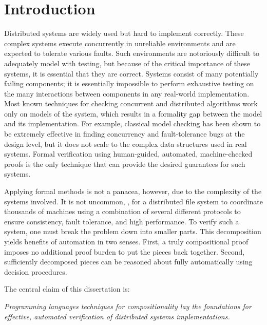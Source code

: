 \chapter{Introduction}

Distributed systems are widely used but hard to implement correctly.
These complex systems execute concurrently in unreliable environments
and are expected to tolerate various faults.
  Such environments are
notoriously difficult to adequately model with testing, but because
of the critical importance of these systems, it is essential that
they are correct.
Systems consist of many potentially failing components; it is
essentially impossible to perform exhaustive testing on the many
interactions between components in any real-world
implementation.
Most known techniques for checking concurrent and
distributed algorithms work only on models of the system, which
results in a formality gap between the model and its
implementation. For example, classical model checking has been shown
to be extremely effective in finding concurrency and fault-tolerance
bugs at the design level, but it does not scale to the complex data
structures used in real systems.
Formal verification using
human-guided, automated, machine-checked proofs is the only
technique that can provide the desired guarantees for such systems.

Applying formal methods is not a panacea, however, due to the
complexity of the systems involved.  It is not uncommon, \eg, for a
distributed file system to coordinate thousands of machines using a
combination of several different protocols to ensure consistency,
fault tolerance, and high performance.  To verify such a
system, one must break the problem down into smaller parts.
This decomposition yields benefits of automation in two senses.
First, a truly compositional proof imposes no additional proof
burden to put the pieces back together. Second, sufficiently
decomposed pieces can be reasoned about fully automatically
using decision procedures. 

The central claim of this dissertation is:
\begin{center}
\emph{Programming languages techniques for compositionality
  lay the foundations for effective, automated verification of
  distributed systems implementations.
}
\end{center}

